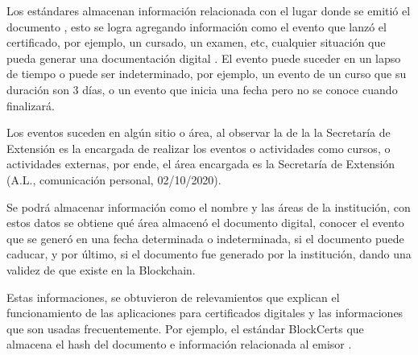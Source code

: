 Los estándares  almacenan información relacionada con el lugar donde se emitió el documento \cite[]{opencerts_gestion_nodate}, esto se logra 
agregando información como el evento  que lanzó el certificado, por ejemplo, un cursado, un examen, etc, cualquier situación que pueda 
generar una documentación digital \cite[]{mit_media_lab_what_2016}.
El evento puede suceder en un lapso de tiempo o puede ser indeterminado, por ejemplo, 
un evento de un curso que su duración son 3 días, o un evento que inicia una fecha pero no se conoce cuando finalizará.

Los eventos suceden en algún sitio o área, al observar  la  de la  
la Secretaría de Extensión es la encargada de realizar los eventos o actividades como cursos, o 
actividades externas, por ende, el  área encargada es la Secretaría de Extensión (A.L., comunicación personal, 02/10/2020).%

Se podrá almacenar información como el nombre y las áreas de la institución, con  estos datos se obtiene qué área almacenó el documento digital, conocer el evento que 
se generó en una fecha determinada o indeterminada, si el documento puede caducar, y por último, 
si el documento fue generado por la institución, dando una validez de que existe en la Blockchain.

Estas informaciones, se obtuvieron de   relevamientos que explican  el funcionamiento de las aplicaciones para certificados digitales y las informaciones que son usadas
frecuentemente. Por  ejemplo, el estándar BlockCerts que almacena el hash del documento e información relacionada
al emisor \cite[]{blockcerts_faq_nodate}.




